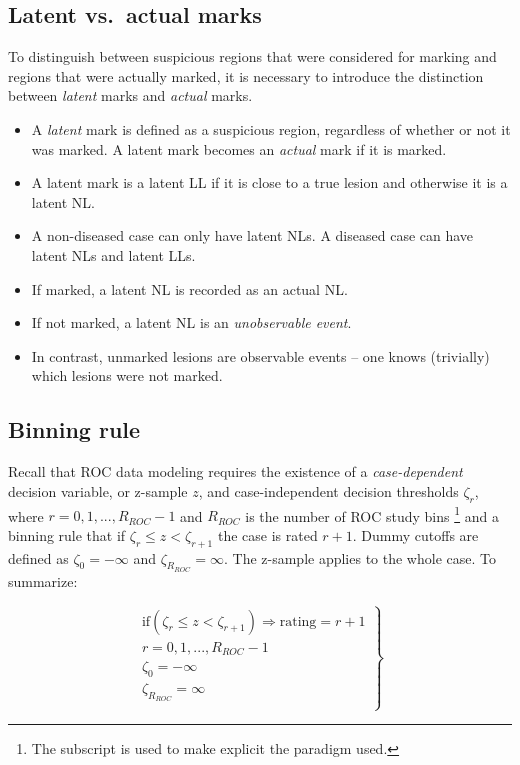 \documentclass[
]{book}
\providecommand{\tightlist}{%
  \setlength{\itemsep}{0pt}\setlength{\parskip}{0pt}}
\begin{document}
\hypertarget{latent-vs.-actual-marks}{%
\subsection{Latent vs.~actual marks}\label{latent-vs.-actual-marks}}

To distinguish between suspicious regions that were considered for marking and regions that were actually marked, it is necessary to introduce the distinction between \emph{latent} marks and \emph{actual} marks.

\begin{itemize}
\tightlist
\item
  A \emph{latent} mark is defined as a suspicious region, regardless of whether or not it was marked. A latent mark becomes an \emph{actual} mark if it is marked.
\item
  A latent mark is a latent LL if it is close to a true lesion and otherwise it is a latent NL.
\item
  A non-diseased case can only have latent NLs. A diseased case can have latent NLs and latent LLs.
\item
  If marked, a latent NL is recorded as an actual NL.
\item
  If not marked, a latent NL is an \emph{unobservable event}.
\item
  In contrast, unmarked lesions are observable events -- one knows (trivially) which lesions were not marked.
\end{itemize}

\hypertarget{binning-rule}{%
\subsection{Binning rule}\label{binning-rule}}

Recall that ROC data modeling requires the existence of a \emph{case-dependent} decision variable, or z-sample \(z\), and case-independent decision thresholds \(\zeta_r\), where \(r = 0, 1, ..., R_{ROC}-1\) and \(R_{ROC}\) is the number of ROC study bins \footnote{The subscript is used to make explicit the paradigm used.} and a binning rule that if \(\zeta_r \leq z < \zeta_{r+1}\) the case is rated \(r + 1\). Dummy cutoffs are defined as \(\zeta_0 = -\infty\) and \(\zeta_{R_{ROC}} = \infty\). The z-sample applies to the whole case. To summarize:

\begin{equation}
\left.
\begin{aligned}  
\text{if} \left (\zeta_r \le z < \zeta_{r+1}  \right )\Rightarrow \text {rating} = r+1\\
r = 0, 1, ..., R_{ROC}-1\\
\zeta_0 = -\infty\\
\zeta_{R_{ROC}} = \infty\\
\end{aligned}
\right \}
\label{eq:binning-rule-roc}
\end{equation}
\end{document}
